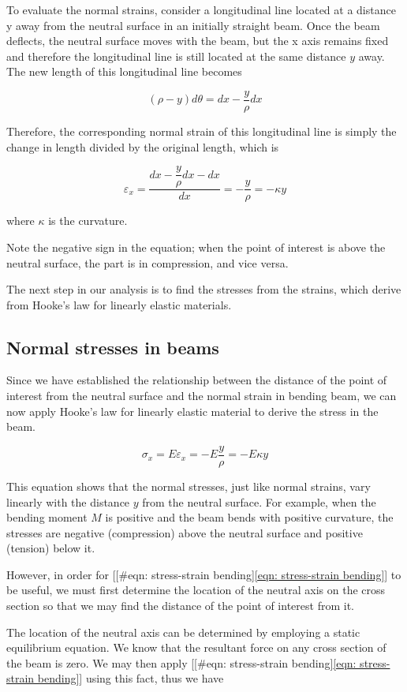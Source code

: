 \documentclass[a4paper,openany,12pt]{book}
\begin{document}
To evaluate the normal strains, consider a longitudinal line located at
a distance y away from the neutral surface in an initially straight
beam. Once the beam deflects, the neutral surface moves with the beam,
but the x axis remains fixed and therefore the longitudinal line is
still located at the same distance \(y\) away. The new length of this
longitudinal line becomes

$$(\rho  - y)d\theta  = dx - \dfrac{y}{\rho }dx$$

Therefore, the corresponding normal strain of this longitudinal line is
simply the change in length divided by the original length, which is

$$\varepsilon _x = \frac{dx - \dfrac{y}{\rho }dx - dx}{dx} =  - \dfrac{y}{\rho } =  - \kappa y$$

where \(\kappa\) is the curvature.

Note the negative sign in the equation; when the point of interest is
above the neutral surface, the part is in compression, and vice versa.

The next step in our analysis is to find the stresses from the strains,
which derive from Hooke's law for linearly elastic materials.

\subsection{Normal stresses in beams}
\label{normal-stresses-in-beams}
Since we have established the relationship between the distance of the
point of interest from the neutral surface and the normal strain in
bending beam, we can now apply Hooke's law for linearly elastic material
to derive the stress in the beam.

$$\sigma_x = E\varepsilon_x =  - E\frac{y}{\rho } =  - E\kappa y$$

This equation shows that the normal stresses, just like normal strains,
vary linearly with the distance \(y\) from the neutral surface. For
example, when the bending moment \(M\) is positive and the beam bends with
positive curvature, the stresses are negative (compression) above the
neutral surface and positive (tension) below it.

However, in order for
[[\#eqn: stress-strain bending]\ref{eqn: stress-strain bending}] to be
useful, we must first determine the location of the neutral axis on the
cross section so that we may find the distance of the point of interest
from it.

The location of the neutral axis can be determined by employing a static
equilibrium equation. We know that the resultant force on any cross
section of the beam is zero. We may then apply
[[\#eqn: stress-strain bending]\ref{eqn: stress-strain bending}] using this
fact, thus we have
\end{document}
